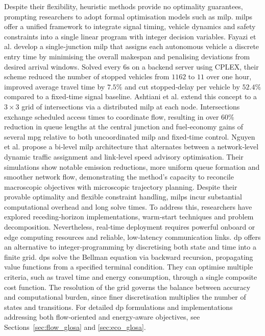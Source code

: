Despite their flexibility, heuristic methods provide no optimality guarantees, prompting researchers to adopt formal optimisation models such as \ac{milp}. \acp{milp} offer a unified framework to integrate signal timing, vehicle dynamics and safety constraints into a single linear program with integer decision variables. Fayazi et al. \cite{Fayazi2017} develop a single‐junction \ac{milp} that assigns each autonomous vehicle a discrete entry time by minimising the overall makespan and penalising deviations from desired arrival windows. Solved every $6\unit{\second}$ on a backend server using CPLEX, their scheme reduced the number of stopped vehicles from $1162$ to $11$ over one hour, improved average travel time by $7.5\%$ and cut stopped‐delay per vehicle by $52.4\%$ compared to a fixed‐time signal baseline. Ashtiani et al. \cite{Ashtiani2018} extend this concept to a $3 \times 3$ grid of intersections via a distributed \ac{milp} at each node. Intersections exchange scheduled access times to coordinate flow, resulting in over $60\%$ reduction in queue lengths at the central junction and fuel‐economy gains of several \ac{mpg} relative to both uncoordinated \ac{milp} and fixed‐time control. Nguyen et al. \cite{Nguyen2022} propose a bi‐level \ac{milp} architecture that alternates between a network‐level dynamic traffic assignment and link‐level speed advisory optimisation. Their simulations show notable emission reductions, more uniform queue formation and smoother network flow, demonstrating the method’s capacity to reconcile macroscopic objectives with microscopic trajectory planning. Despite their provable optimality and flexible constraint handling, \acp{milp} incur substantial computational overhead and long solve times. To address this, researchers have explored receding‐horizon implementations, warm‐start techniques and problem decomposition. Nevertheless, real‐time deployment requires powerful onboard or edge computing resources and reliable, low‐latency communication links.
\mynewline
\acf{dp} offers an alternative to integer‐programming by discretising both state and time into a finite grid. \acp{dp} solve the Bellman equation via backward recursion, propagating value functions from a specified terminal condition. They can optimise multiple criteria, such as travel time and energy consumption, through a single composite cost function. The resolution of the grid governs the balance between accuracy and computational burden, since finer discretisation multiplies the number of states and transitions. For detailed \ac{dp} formulations and implementations addressing both flow‐oriented and energy‐aware objectives, see Sections~\vref{sec:flow_glosa} and \vref{sec:eco_glosa}.
